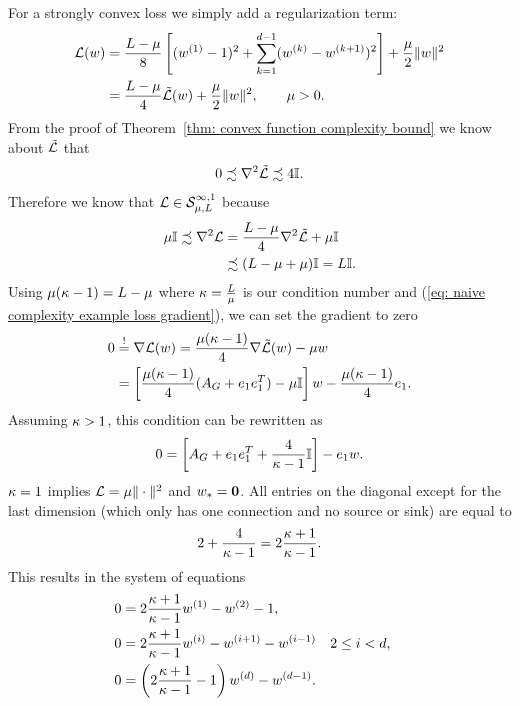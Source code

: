 For a strongly convex loss we simply add a regularization term:
%
\begin{align*}
	\Loss(\weights)
	&= \frac{\ubound -\lbound}{8} \left[
		(\weights^{(1)}-1)^2
		+ \sum_{k=1}^{\dimension-1} (\weights^{(k)}-\weights^{(k+1)})^2
	\right]
	+ \frac\lbound{2} \| \weights \|^2\\
	&= \frac{\ubound - \lbound}{4} \tilde{\Loss}(\weights)
	+ \frac{\lbound}{2}\| \weights \|^2, \qquad \lbound>0.
\end{align*}
%
From the proof of Theorem~\ref{thm: convex function complexity bound} we know
about \(\tilde{\Loss}\) that
%
\begin{align*}
	0 \precsim \nabla^2\tilde{\Loss} \precsim 4\identity.
\end{align*}
%
Therefore we know that \(\Loss\in\strongConvex[\infty,1]{\lbound}{\ubound}\) because
%
\begin{align*}
	\lbound\identity
	\precsim \nabla^2\Loss
	&= \frac{\ubound - \lbound}{4} \nabla^2 \tilde{\Loss} + \lbound\identity\\
	&\precsim (\ubound - \lbound + \lbound)\identity = \ubound \identity.
\end{align*}
%
Using \(\lbound(\condition -1)=\ubound-\lbound\) where
\(\condition=\tfrac\ubound\lbound\) is our condition number and (\ref{eq: naive
complexity example loss gradient}), we can set the gradient to zero
\begin{align*}
	0 &\lxeq{!} \nabla \Loss(\weights)
	=  \frac{\lbound(\condition -1)}{4} \nabla\tilde{\Loss}(\weights) - \lbound \weights\\
	&= \left[
		\frac{\lbound(\condition-1)}{4}(A_G + \stdBasis_1\stdBasis_1^T) - \lbound\identity
	\right]\weights - \frac{\lbound(\condition-1)}{4}\stdBasis_1.
\end{align*}
%
Assuming \(\condition>1\), this condition can be rewritten as
%
\begin{align*}
	0 =  \left[
		A_G + \stdBasis_1\stdBasis_1^T + \frac{4}{\condition-1}\identity
	\right] - \stdBasis_1
	\weights.
\end{align*}
\(\condition=1\) implies \(\Loss=\lbound\|\cdot\|^2\) and
\(\minimum=\mathbf{0}\).
%
All entries on the diagonal except for the last dimension (which only has one
connection and no source or sink) are equal to
%
\begin{align*}
	2+\frac{4}{\condition-1} = 2\frac{\condition +1}{\condition-1}.
\end{align*}
%
This results in the system of equations
%
\begin{subequations}
\label{eq: solution to the strongly convex coloring problem}
\begin{align}
	0&=2\frac{\condition+1}{\condition -1}\weights^{(1)} - \weights^{(2)} -1, \\
	0&=2\frac{\condition+1}{\condition -1}\weights^{(i)}
	- \weights^{(i+1)} - \weights^{(i-1)}
	&& 2\le i <d, \\
	\label{eq: solution to the strongly convex coloring problem c}
	0&= \left(2\frac{\condition+1}{\condition -1} -1 \right)\weights^{(d)}
	- \weights^{(d-1)}.
\end{align}
\end{subequations}
